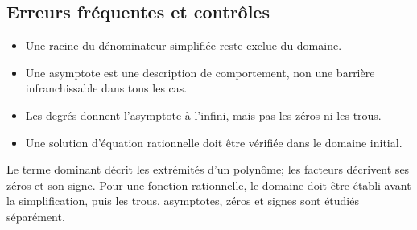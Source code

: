 \subsection{Erreurs fréquentes et contrôles}

\begin{itemize}
\item Une racine du dénominateur simplifiée reste exclue du domaine.
\item Une asymptote est une description de comportement, non une barrière infranchissable dans tous les cas.
\item Les degrés donnent l'asymptote à l'infini, mais pas les zéros ni les trous.
\item Une solution d'équation rationnelle doit être vérifiée dans le domaine initial.
\end{itemize}

\begin{summarybox}
Le terme dominant décrit les extrémités d'un polynôme; les facteurs décrivent ses zéros et son signe. Pour une fonction rationnelle, le domaine doit être établi avant la simplification, puis les trous, asymptotes, zéros et signes sont étudiés séparément.
\end{summarybox}
